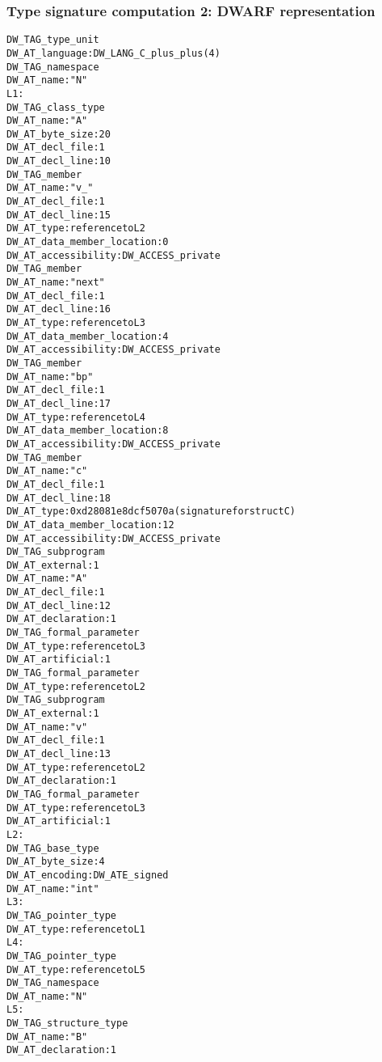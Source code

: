 \subsubsection{Type signature  computation 2: DWARF representation}
\label{app:typesignaturecomputation2dwarfrepresentation}

\begin{alltt}
  DW\_TAG\_type\_unit
      DW\_AT\_language: DW\_LANG\_C\_plus\_plus (4)
    DW\_TAG\_namespace
          DW\_AT\_name: "N"
L1:
        DW\_TAG\_class\_type
             DW\_AT\_name: "A"
             DW\_AT\_byte\_size: 20
             DW\_AT\_decl\_file: 1
             DW\_AT\_decl\_line: 10
           DW\_TAG\_member
                DW\_AT\_name: "v\_"
                DW\_AT\_decl\_file: 1
                DW\_AT\_decl\_line: 15
                DW\_AT\_type: reference to L2
                DW\_AT\_data\_member\_location: 0
                DW\_AT\_accessibility: DW\_ACCESS\_private
          DW\_TAG\_member
               DW\_AT\_name: "next"
               DW\_AT\_decl\_file: 1
               DW\_AT\_decl\_line: 16
               DW\_AT\_type: reference to L3
               DW\_AT\_data\_member\_location: 4
               DW\_AT\_accessibility: DW\_ACCESS\_private
          DW\_TAG\_member
               DW\_AT\_name: "bp"
               DW\_AT\_decl\_file: 1
               DW\_AT\_decl\_line: 17
               DW\_AT\_type: reference to L4
               DW\_AT\_data\_member\_location: 8
               DW\_AT\_accessibility: DW\_ACCESS\_private
          DW\_TAG\_member
               DW\_AT\_name: "c"
               DW\_AT\_decl\_file: 1
               DW\_AT\_decl\_line: 18
               DW\_AT\_type: 0xd28081e8 dcf5070a (signature for struct C)
               DW\_AT\_data\_member\_location: 12
               DW\_AT\_accessibility: DW\_ACCESS\_private
       DW\_TAG\_subprogram
           DW\_AT\_external: 1
           DW\_AT\_name: "A"
           DW\_AT\_decl\_file: 1
           DW\_AT\_decl\_line: 12
           DW\_AT\_declaration: 1
        DW\_TAG\_formal\_parameter
           DW\_AT\_type: reference to L3
           DW\_AT\_artificial: 1
        DW\_TAG\_formal\_parameter
           DW\_AT\_type: reference to L2
       DW\_TAG\_subprogram
           DW\_AT\_external: 1
           DW\_AT\_name: "v"
           DW\_AT\_decl\_file: 1
           DW\_AT\_decl\_line: 13
           DW\_AT\_type: reference to L2
           DW\_AT\_declaration: 1
         DW\_TAG\_formal\_parameter
           DW\_AT\_type: reference to L3
           DW\_AT\_artificial: 1
L2:
    DW\_TAG\_base\_type
         DW\_AT\_byte\_size: 4
         DW\_AT\_encoding: DW\_ATE\_signed
         DW\_AT\_name: "int"
L3:
    DW\_TAG\_pointer\_type
         DW\_AT\_type: reference to L1
L4:
    DW\_TAG\_pointer\_type
         DW\_AT\_type: reference to L5
    DW\_TAG\_namespace
         DW\_AT\_name: "N"
L5:
       DW\_TAG\_structure\_type
           DW\_AT\_name: "B"
           DW\_AT\_declaration: 1
\end{alltt}


